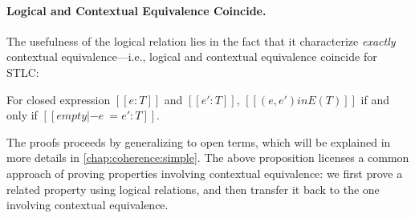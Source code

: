 \paragraph{Logical and Contextual Equivalence Coincide.}

The usefulness of the logical relation lies in the fact that it characterize
\emph{exactly} contextual equivalence---i.e., logical and contextual equivalence
coincide for STLC:

\begin{proposition}
  For closed expression $[[e : T]]$ and $[[e' : T]]$, $[[ (e, e') in E(T)  ]]$ if and only if $[[  empty |- e ~= e' : T  ]]$.
\end{proposition}

The proofs proceeds by generalizing to open terms, which will be explained in
more details in \cref{chap:coherence:simple}. The above proposition licenses a
common approach of proving properties involving contextual equivalence: we first
prove a related property using logical relations, and then transfer it back to
the one involving contextual equivalence.



